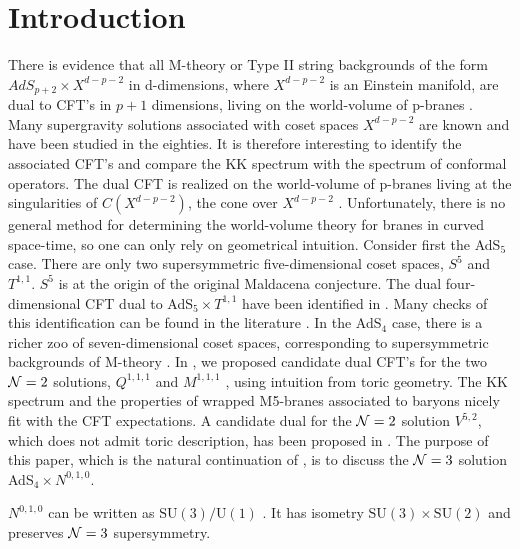 \documentclass[a4paper,12pt]{article}
\def\n010{N^{0,1,0}}
\begin{document}
\section{Introduction}
There is  evidence that all M-theory or Type II string backgrounds
of the form $AdS_{p+2}\times X^{d-p-2}$ in d-dimensions, where
$X^{d-p-2}$ is an Einstein manifold, are dual to CFT's in $p+1$
dimensions, living on the world-volume of p-branes \cite{review}.
Many supergravity solutions associated with coset spaces  $X^{d-p-2}$
are known and have been studied in the eighties.
It is therefore interesting to identify the associated CFT's and compare
the KK spectrum with the spectrum of conformal operators.
The dual CFT is realized on the world-volume of p-branes living at the
singularities of $C(X^{d-p-2})$, the cone over $X^{d-p-2}$
\cite{witkleb,fig,morpless}.
Unfortunately, there is no general method for determining the world-volume
theory for branes in curved space-time, so one can only rely on geometrical
intuition.
Consider first the AdS$_5$ case.
There are only two supersymmetric five-dimensional coset spaces, $S^5$
and $T^{1,1}$. $S^5$ is at the origin of the original Maldacena conjecture.
The dual four-dimensional CFT dual to AdS$_5\times T^{1,1}$ have been
identified in \cite{witkleb}.
Many checks of this identification can be found in the literature
\cite{witkleb,gubser,gubserkleb,sergiotorino}.
In the AdS$_4$ case, there is a richer zoo of seven-dimensional coset spaces,
corresponding to supersymmetric backgrounds of M-theory \cite{castromwar}.
In \cite{3dcft}, we proposed candidate dual CFT's for the two ${\cal N}=2$
solutions, $Q^{1,1,1}$ \cite{q111} and $M^{1,1,1}$ \cite{m111}, using
intuition from toric geometry.
The KK spectrum and the properties of wrapped M5-branes associated to
baryons nicely fit with the CFT expectations.
A candidate dual for the ${\cal N}=2$ solution $V^{5,2}$, which does not
admit toric description, has been proposed in \cite{poliv52}.
The purpose of this paper, which is the natural continuation of \cite{3dcft},
is to discuss the  ${\cal N}=3$ solution AdS$_4\times \n010$.
\par
$\n010$ can be written as $\mathrm{SU(3)}/\mathrm{U(1)}$ \cite{castn010}.
It has isometry $\mathrm{SU(3)}\times \mathrm{SU(2)}$ and preserves
${\cal N}=3$ supersymmetry.
\end{document}
